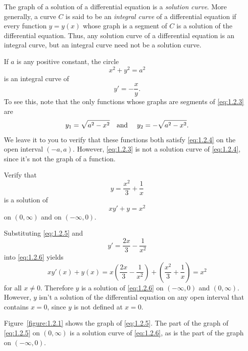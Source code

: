 The graph of a solution of a differential equation is a {\color{blue}\it solution curve\/}. More
generally, a curve $C$ is said to be an {\color{blue}\it integral curve\/} of a differential
equation if every function $y=y(x)$ whose graph is a segment of $C$ is a solution of the
differential equation. Thus, any solution curve of a differential equation is an integral curve, but
an integral curve need not be a solution curve.

\begin{example}
  \label{example:1.2.1} \rm If $a$ is any positive constant, the circle
  \begin{equation}
    \label{eq:1.2.3}x^{2}+y^{2}=a^{2}
  \end{equation}
  is an integral curve of
  \begin{equation}
    \label{eq:1.2.4}y'=-\frac{x}{y}.
  \end{equation}
  To see this, note that the only functions whose graphs are segments of \eqref{eq:1.2.3} are
  \[
    y_{1}=\sqrt{a^{2}-x^{2}}\mbox{\quad and \quad}y_{2}=-\sqrt{a^{2}-x^{2}}.
  \]
  We leave it to you to verify that these functions both satisfy \eqref{eq:1.2.4} on the open
  interval $(-a,a)$. However, \eqref{eq:1.2.3} is not a solution curve of \eqref{eq:1.2.4}, since
  it's not the graph of a function.
\end{example}

\begin{example}
  \label{example:1.2.2} \rm Verify that
  \begin{equation}
    \label{eq:1.2.5}y=\frac{x^{2}}{3}+\frac{1}{x}
  \end{equation}
  is a solution of
  \begin{equation}
    \label{eq:1.2.6}xy'+y=x^{2}
  \end{equation}
  on $(0,\infty)$ and on $(-\infty,0)$.
\end{example}

\begin{examplesolution}
\solution Substituting \eqref{eq:1.2.5} and
\[
  y'=\frac{2x}{3}-\frac{1}{x^{2}}
\]
into \eqref{eq:1.2.6} yields
\[
  xy'(x)+y(x)=x\left(\frac{2x}{3}-\frac{1}{x^{2}}\right)+ \left(\frac{x^{2}}{3}+\frac{1}{x}\right)=x^{2}
\]
for all $x\ne0$. Therefore $y$ is a solution of \eqref{eq:1.2.6} on $(-\infty,0)$ and $(0,\infty)$.
However, $y$ isn't a solution of the differential equation on any open interval that contains $x=0$,
since $y$ is not defined at $x=0$.

Figure~\ref{figure:1.2.1} shows the graph of \eqref{eq:1.2.5}. The part of the graph of
\eqref{eq:1.2.5} on $(0,\infty)$ is a solution curve of \eqref{eq:1.2.6}, as is the part of the
graph on $(-\infty,0)$.
\end{examplesolution}

